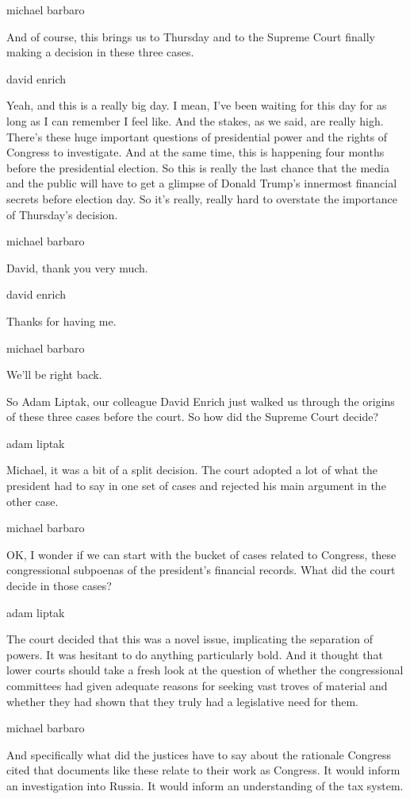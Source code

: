 michael barbaro

And of course, this brings us to Thursday and to the Supreme Court
finally making a decision in these three cases.

david enrich

Yeah, and this is a really big day. I mean, I've been waiting for this
day for as long as I can remember I feel like. And the stakes, as we
said, are really high. There's these huge important questions of
presidential power and the rights of Congress to investigate. And at the
same time, this is happening four months before the presidential
election. So this is really the last chance that the media and the
public will have to get a glimpse of Donald Trump's innermost financial
secrets before election day. So it's really, really hard to overstate
the importance of Thursday's decision.

michael barbaro

David, thank you very much.

david enrich

Thanks for having me.

michael barbaro

We'll be right back.

So Adam Liptak, our colleague David Enrich just walked us through the
origins of these three cases before the court. So how did the Supreme
Court decide?

adam liptak

Michael, it was a bit of a split decision. The court adopted a lot of
what the president had to say in one set of cases and rejected his main
argument in the other case.

michael barbaro

OK, I wonder if we can start with the bucket of cases related to
Congress, these congressional subpoenas of the president's financial
records. What did the court decide in those cases?

adam liptak

The court decided that this was a novel issue, implicating the
separation of powers. It was hesitant to do anything particularly bold.
And it thought that lower courts should take a fresh look at the
question of whether the congressional committees had given adequate
reasons for seeking vast troves of material and whether they had shown
that they truly had a legislative need for them.

michael barbaro

And specifically what did the justices have to say about the rationale
Congress cited that documents like these relate to their work as
Congress. It would inform an investigation into Russia. It would inform
an understanding of the tax system.


